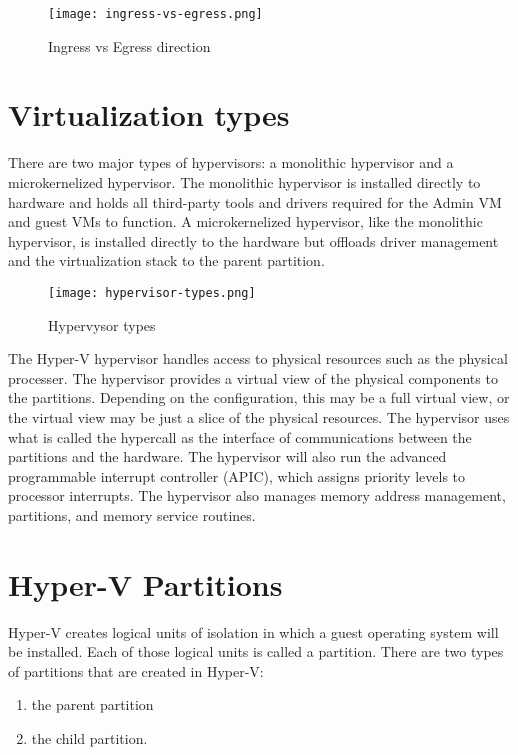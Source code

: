\begin{figure}[h]
\centering
\texttt{[image: ingress-vs-egress.png]}
\caption{Ingress vs Egress direction}
\label{ingress-vs-egress}
\end{figure}

\vspace{5mm}
\section{Virtualization types}
\vspace{5mm}
There are two major types of hypervisors: a monolithic hypervisor and a microkernelized hypervisor. The monolithic hypervisor is installed directly to hardware and holds
all third-party tools and drivers required for the Admin VM and guest VMs to function. A microkernelized hypervisor, like the monolithic hypervisor, is installed directly to the
hardware but offloads driver management and the virtualization stack to the parent partition.

\vspace{5mm}

\begin{figure}[h]
\centering
\texttt{[image: hypervisor-types.png]}
\caption{Hypervysor types}
\label{hypervisor-types}
\end{figure}

\vspace{5mm}

The Hyper-V hypervisor handles access to physical resources such as the physical processer. The hypervisor provides a virtual view of the physical components to the
partitions. Depending on the configuration, this may be a full virtual view, or the virtual view may be just a slice of the physical resources. The hypervisor uses what is called the
hypercall as the interface of communications between the partitions and the hardware. The hypervisor will also run the advanced programmable interrupt controller (APIC),
which assigns priority levels to processor interrupts. The hypervisor also manages memory address management, partitions, and memory service routines.

\vspace{5mm}
\section{Hyper-V Partitions}
\vspace{5mm}

Hyper-V creates logical units of isolation in which a guest operating system will be installed. Each of those logical units is called a partition. There are two types of partitions that are created in Hyper-V:
\begin{enumerate}
	\item the parent partition 
	\item the child partition.
\end{enumerate}

